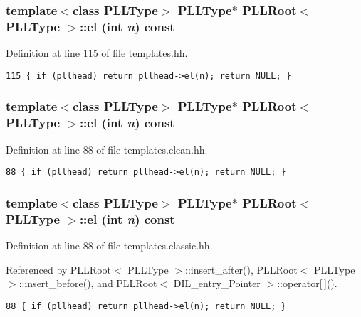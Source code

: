 \subsubsection{\setlength{\rightskip}{0pt plus 5cm}template$<$class PLLType$>$ {\bf PLLType}$\ast$ PLLRoot$<$ {\bf PLLType} $>$::el (int {\em n}) const\hspace{0.3cm}{\tt  [inline]}}\label{classPLLRoot_a38}




Definition at line 115 of file templates.hh.



\footnotesize\begin{verbatim}115 { if (pllhead) return pllhead->el(n); return NULL; } 
\end{verbatim}\normalsize 
{}
\subsubsection{\setlength{\rightskip}{0pt plus 5cm}template$<$class PLLType$>$ {\bf PLLType}$\ast$ PLLRoot$<$ {\bf PLLType} $>$::el (int {\em n}) const\hspace{0.3cm}{\tt  [inline]}}\label{classPLLRoot_a21}




Definition at line 88 of file templates.clean.hh.



\footnotesize\begin{verbatim}88 { if (pllhead) return pllhead->el(n); return NULL; } 
\end{verbatim}\normalsize 
{}
\subsubsection{\setlength{\rightskip}{0pt plus 5cm}template$<$class PLLType$>$ {\bf PLLType}$\ast$ PLLRoot$<$ {\bf PLLType} $>$::el (int {\em n}) const\hspace{0.3cm}{\tt  [inline]}}\label{classPLLRoot_a4}




Definition at line 88 of file templates.classic.hh.

Referenced by PLLRoot$<$ PLLType $>$::insert\_\-after(), PLLRoot$<$ PLLType $>$::insert\_\-before(), and PLLRoot$<$ DIL\_\-entry\_\-Pointer $>$::operator[$\,$]().



\footnotesize\begin{verbatim}88 { if (pllhead) return pllhead->el(n); return NULL; } 
\end{verbatim}\normalsize 
{}
